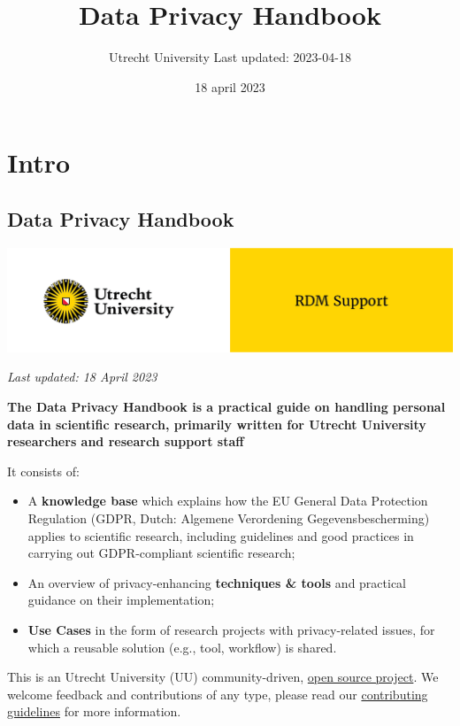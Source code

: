 \documentclass[
]{book}
\title{Data Privacy Handbook}
\author{Utrecht University \textbar{} Last updated: 2023-04-18}
\date{18 april 2023}
\providecommand{\tightlist}{%
  \setlength{\itemsep}{0pt}\setlength{\parskip}{0pt}}
\begin{document}
\maketitle

{
\setcounter{tocdepth}{1}
\tableofcontents
}
\hypertarget{part-intro}{%
\part*{Intro}\label{part-intro}}

\hypertarget{data-privacy-handbook}{%
\chapter*{Data Privacy Handbook}\label{data-privacy-handbook}}

\includegraphics{img/cover-image-dph.png}

\emph{Last updated: 18 April 2023}

\textbf{The Data Privacy Handbook is a practical guide on handling personal data in
scientific research, primarily written for Utrecht University researchers and
research support staff}

It consists of:

\begin{itemize}
\tightlist
\item
  A \textbf{knowledge base} which explains how the EU General Data Protection
  Regulation (GDPR, Dutch: Algemene Verordening Gegevensbescherming) applies to
  scientific research, including guidelines and good practices in carrying out
  GDPR-compliant scientific research;
\item
  An overview of privacy-enhancing \textbf{techniques \& tools} and practical guidance
  on their implementation;
\item
  \textbf{Use Cases} in the form of research projects with privacy-related issues,
  for which a reusable solution (e.g., tool, workflow) is shared.
\end{itemize}

This is an Utrecht University (UU) community-driven,
\href{https://github.com/UtrechtUniversity/dataprivacyhandbook}{open source project}.
We welcome feedback and contributions of any type, please read our
\href{https://github.com/UtrechtUniversity/dataprivacyhandbook/blob/main/CONTRIBUTING.md}{contributing guidelines}
for more information.
\end{document}
